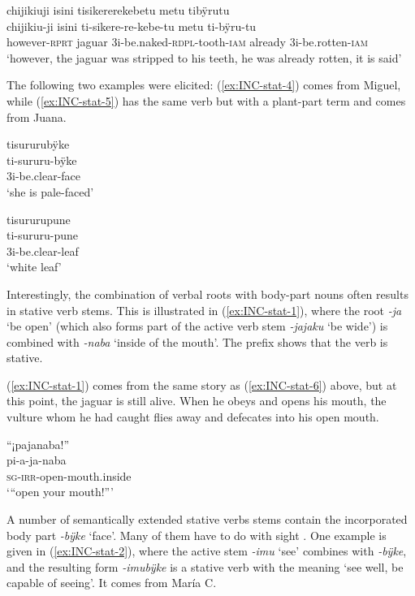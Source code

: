 \ea\label{ex:INC-stat-6}
\begingl
\glpreamble chijikiuji isini tisikererekebetu metu tibÿrutu\\
\gla chijikiu-ji isini ti-sikere-re-kebe-tu metu ti-bÿru-tu\\
\glb however-\textsc{rprt} jaguar 3i-be.naked-\textsc{rdpl}-tooth-\textsc{iam} already 3i-be.rotten-\textsc{iam}\\
\glft ‘however, the jaguar was stripped to his teeth, he was already rotten, it is said’
\endgl
\trailingcitation{[jmx-n120429ls-x5.288]}
\xe

The following two examples were elicited: (\ref{ex:INC-stat-4}) comes from Miguel, while (\ref{ex:INC-stat-5}) has the same verb but with a plant-part term and comes from Juana.

\ea\label{ex:INC-stat-4}
\begingl
\glpreamble tisururubÿke\\
\gla ti-sururu-bÿke\\
\glb 3i-be.clear-face\\
\glft ‘she is pale-faced’
\endgl
\trailingcitation{[mdx-c120416ls.137]}%
\xe

\ea\label{ex:INC-stat-5}
\begingl
\glpreamble tisururupune\\
\gla ti-sururu-pune\\
\glb 3i-be.clear-leaf\\
\glft ‘white leaf’
\endgl
\trailingcitation{[jxx-e150925l-1.180]}
\xe

Interestingly, the combination of verbal roots with body-part nouns often results in stative verb stems. This is illustrated in (\ref{ex:INC-stat-1}), where the root \textit{-ja} ‘be open’ (which also forms part of the active verb stem \textit{-jajaku} ‘be wide’) is combined with \textit{-naba} ‘inside of the mouth’. The  prefix shows that the verb is stative.

(\ref{ex:INC-stat-1}) comes from the same story as (\ref{ex:INC-stat-6}) above, but at this point, the jaguar is still alive. When he obeys and opens his mouth, the vulture whom he had caught flies away and defecates into his open mouth.

\ea\label{ex:INC-stat-1}
\begingl
\glpreamble “¡pajanaba!”\\
\gla pi-a-ja-naba\\
\textsc{sg}-\textsc{irr}-open-mouth.inside\\
\glft ‘“open your mouth!”’
\endgl
\trailingcitation{[jmx-n120429ls-x5.197]}
\xe

A number of semantically extended stative verbs stems contain the incorporated body part \textit{-bÿke} ‘face’. Many of them have to do with sight \citep[267]{TerhartDanielsenBODY}. One example is given in (\ref{ex:INC-stat-2}), where the active stem \textit{-imu} ‘see’ combines with \textit{-bÿke}, and the resulting form \textit{-imubÿke} is a stative verb with the meaning ‘see well, be capable of seeing’. It comes from María C.

